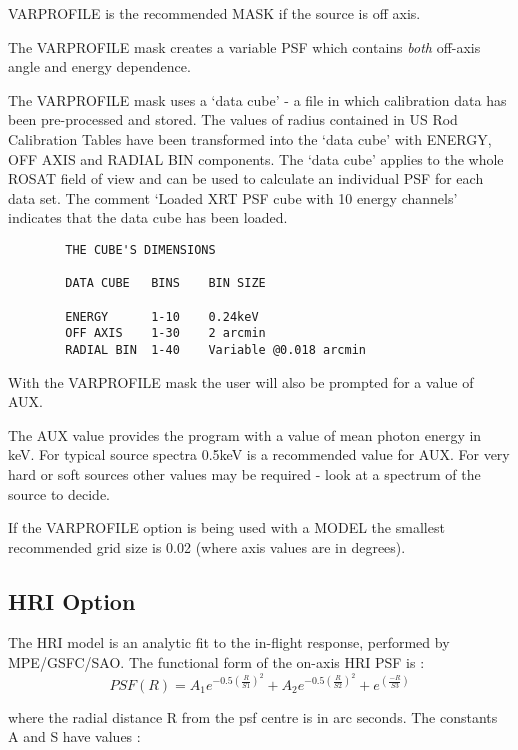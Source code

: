 \documentclass[11pt,fleqn]{article}    %
\begin{document}
VARPROFILE is the recommended MASK if the source is off axis.

The VARPROFILE mask creates  a variable PSF  which contains {\it both }
off-axis angle and energy dependence.

The VARPROFILE mask uses a `data cube'  - a file  in which calibration data
has been pre-processed and stored.   The values of  radius contained in  US
Rod  Calibration  Tables have been  transformed  into the `data  cube' with
ENERGY, OFF AXIS and RADIAL BIN components.  The `data cube' applies to the
whole ROSAT field of  view and can be used  to calculate an  individual PSF
for each data set.   The   comment `Loaded  XRT  PSF  cube with 10   energy
channels' indicates that the data cube has been loaded. 

\begin{verbatim}
        THE CUBE'S DIMENSIONS

        DATA CUBE   BINS    BIN SIZE

        ENERGY      1-10    0.24keV
        OFF AXIS    1-30    2 arcmin
        RADIAL BIN  1-40    Variable @0.018 arcmin       
\end{verbatim}

With  the VARPROFILE mask  the user will also be prompted for a value of AUX.

The AUX value  provides the program with a  value of mean photon energy  in
keV. For typical source spectra 0.5keV is  a recommended value for AUX. For
very hard or soft sources other values may be required - look at a spectrum
of the source to decide.

If  the  VARPROFILE option   is  being  used with   a MODEL   the  smallest
recommended grid size is 0.02 (where axis values are in degrees).

\subsection{HRI Option}

The HRI model  is an analytic fit  to the in-flight response, performed  by
MPE/GSFC/SAO. The functional form of the on-axis HRI PSF is :
\begin{displaymath}
 PSF(R) = A_{1} e^{-0.5({\frac{R}{S1}})^2} + A_{2} e^{-0.5({\frac{R}{S2}})^2} + e^{(\frac{-R}{S3})}
\end{displaymath}

 where the radial distance R from the psf centre is in arc seconds.
 The constants A and S have values :
\end{document}
